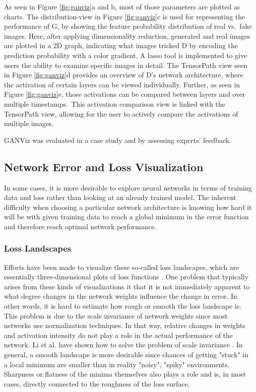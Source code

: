 \documentclass{acmsiggraph}               %
\begin{document}
As seen in Figure \ref{fig:ganviz}a and b, most of those parameters are plotted as charts. The distribution-view in Figure \ref{fig:ganviz}c is used for representing the performance of G, by showing the feature probability distribution of real vs.~fake images. Here, after applying dimensionality reduction, generated and real images are plotted in a 2D graph, indicating what images tricked D by encoding the prediction probability with a color gradient. A lasso tool is implemented to give users the ability to examine specific images in detail. The TensorPath view seen in Figure \ref{fig:ganviz}d provides an overview of D's network architecture, where the activation of certain layers can be viewed individually. Further, as seen in Figure \ref{fig:ganviz}e, those activations can be compared between layers and over multiple timestamps. This activation comparison view is linked with the TensorPath view, allowing for the user to actively compare the activations of multiple images.

GANViz was evaluated in a case study and by assessing experts' feedback.

\subsection{Network Error and Loss Visualization}
In some cases, it is more desirable to explore neural networks in terms of training data and loss rather than looking at an already trained model.
The inherent difficulty when choosing a particular network architecture is knowing how hard it will be with given training data to reach a global minimum in the error function and therefore reach optimal network performance.

\subsubsection{Loss Landscapes}
Efforts have been made to visualize these so-called loss landscapes, which are essentially three-dimensional plots of loss functions \cite{Li2017}.
One problem that typically arises from these kinds of visualizations it that it is not immediately apparent to what degree changes in the network weights influence the change in error. In other words, it is hard to estimate how rough or smooth the loss landscape is. This problem is due to the scale invariance of network weights since most networks use normalization techniques. In that way, relative changes in weights and activation intensity do not play a role in the actual performance of the network. Li et al. have shown how to solve the problem of scale invariance \cite{Li2017}. In general, a smooth landscape is more desirable since chances of getting "stuck" in a local minimum are smaller than in reality "noisy", "spiky" environments. Sharpness or flatness of the minima themselves also plays a role and is, in most cases, directly connected to the roughness of the loss surface.
\end{document}
